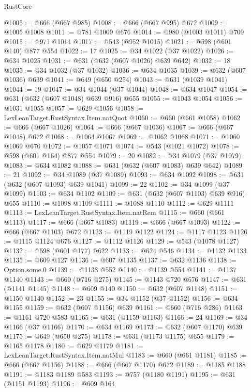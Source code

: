 \begin{lexlean}{RustCore}
\begin{coremodule}
@1005 := @666 (@667 @985)
@1008 := @666 (@667 @995) @672
@1009 := @1005 @1008
@1011 := @781 @1009 @676
@1014 := @980 (@1003 @1011) @709
@1015 := @971 @1014
@1017 := @543 (@952 @1015)
@1021 := @598 (@601 @140) @877 @554
@1022 := 17
@1025 := @34 @1022 (@37 @1022)
@1026 := @634 @1025
@1031 := @631 (@632 (@607 @1026) @639 @642)
@1032 := 18
@1035 := @34 @1032 (@37 @1032)
@1036 := @634 @1035
@1039 := @632 (@607 @1036) @639
@1041 := @649 (@650 @254)
@1043 := @631 (@1039 @1041)
@1044 := 19
@1047 := @34 @1044 (@37 @1044)
@1048 := @634 @1047
@1054 := @631 (@632 (@607 @1048) @639 @916) @655
@1055 := @1043 @1054
@1056 := @1031 @1055
@1057 := @629 @1056
@1058 := LexLeanTarget.RustSyntax.Item.natQuot
@1060 := @660 (@661 @1058)
@1062 := @666 (@667 @1026)
@1064 := @666 (@667 @1036)
@1067 := @666 (@667 @1048) @672
@1068 := @1064 @1067
@1069 := @1062 @1068
@1071 := @1060 @1069 @676
@1072 := @1057 @1071
@1074 := @543 (@1021 @1072)
@1078 := @598 (@601 @164) @877 @554
@1079 := 20
@1082 := @34 @1079 (@37 @1079)
@1083 := @634 @1082
@1088 := @631 (@632 (@607 @1083) @639 @642)
@1089 := 21
@1092 := @34 @1089 (@37 @1089)
@1093 := @634 @1092
@1098 := @631 (@632 (@607 @1093) @639 @1041)
@1099 := 22
@1102 := @34 @1099 (@37 @1099)
@1103 := @634 @1102
@1109 := @631 (@632 (@607 @1103) @639 @916) @655
@1110 := @1098 @1109
@1111 := @1088 @1110
@1112 := @629 @1111
@1113 := LexLeanTarget.RustSyntax.Item.natRem
@1115 := @660 (@661 @1113)
@1117 := @666 (@667 @1083)
@1119 := @666 (@667 @1093)
@1122 := @666 (@667 @1103) @672
@1123 := @1119 @1122
@1124 := @1117 @1123
@1126 := @1115 @1124 @676
@1127 := @1112 @1126
@1129 := @543 (@1078 @1127)
@1132 := @598 (@601 @177) @622
@1133 := @624 @546
@1134 := @1132 @1133
@1135 := @609 @127
@1136 := @607 @1135
@1137 := @632 @1136
@1138 := Option.some.{0}
@1139 := @1138 @552
@1140 := @1139 @554
@1141 := @1137 @1140
@1143 := @660 (@716 @275)
@1145 := @1143 @720 @676
@1147 := @631 (@1141 @1145)
@1148 := @609 @140
@1150 := @632 (@607 @1148)
@1151 := @1150 @1140
@1152 := 23
@1155 := @34 @1152 (@37 @1152)
@1156 := @634 @1155
@1159 := @632 (@607 @1156) @639
@1161 := @660 (@716 @286)
@1163 := @1161 @720 @583
@1165 := @631 (@1159 @1163)
@1166 := 24
@1169 := @34 @1166 (@37 @1166)
@1170 := @634 @1169
@1173 := @632 (@607 @1170) @639
@1175 := @649 (@650 @275)
@1178 := @631 (@1173 @1175) @655
@1179 := @1165 @1178
@1180 := @629 @1179
@1181 := LexLeanTarget.RustSyntax.Item.natMul
@1183 := @660 (@661 @1181)
@1185 := @666 (@667 @1156)
@1188 := @666 (@667 @1170) @672
@1189 := @1185 @1188
@1191 := @1183 @1189 @583
@1193 := @757 (@1180 @1191)
@1195 := @631 (@1151 @1193)
@1196 := @609 @164

\end{coremodule}
\end{lexlean}
